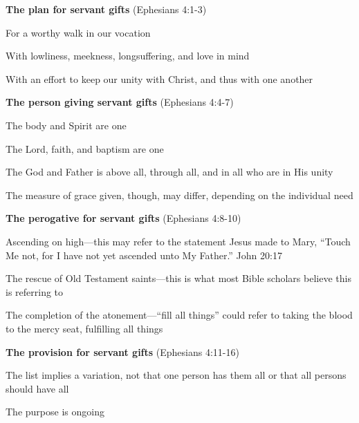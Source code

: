 \begin{compactenum}[I.]
    \item \textbf{The plan for servant gifts}  (Ephesians 4:1-3) 
    \begin{compactenum}[A.]
    	\item For a worthy walk in our vocation
    	\item With lowliness, meekness, longsuffering, and love in mind
    	\item With an effort to keep our unity with Christ, and thus with one another
    \end{compactenum}
    \item \textbf{The person giving servant gifts}  (Ephesians 4:4-7) 
    \begin{compactenum}[A.]
    	\item The body and Spirit are one
    	\item The Lord, faith, and baptism are one
    	\item The God and Father is above all, through all, and in all who are in His unity
    	\item The measure of grace given, though, may differ, depending on the individual need
    \end{compactenum}
    \item \textbf{The perogative for servant gifts}  (Ephesians 4:8-10) 
    \begin{compactenum}[A.]
    	\item Ascending on high—this may refer to the statement Jesus made to Mary, “Touch Me not, for I have
not yet ascended unto My Father.” John 20:17
    	\item The rescue of Old Testament saints—this is what most Bible scholars believe this is referring to
    	\item The completion of the atonement—“fill all things” could refer to taking the blood to the mercy seat, fulfilling all things
    \end{compactenum}
    \item \textbf{The provision for servant gifts}  (Ephesians 4:11-16) 
    \begin{compactenum}[A.]
    	\item The list implies a variation, not that one person has them all or that all persons should have all
    	\item The purpose is ongoing

\end{compactenum}
\end{compactenum}
